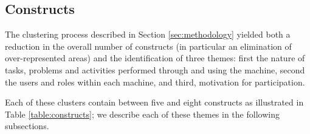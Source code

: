 \documentclass{sig-alternate}
\begin{document}


\subsection{Constructs}
The clustering process described in Section \ref{sec:methodology} yielded both a
reduction in the overall number of constructs (in particular an
elimination of over-represented areas) and the identification of three
themes: first the nature of tasks, problems and activities
performed through and using the machine, second the users and roles within
each machine, and third, motivation for participation.

Each of these clusters contain between five and eight constructs as illustrated in Table
\ref{table:constructs}; we describe each of these themes in the
following subsections.
\end{document}
